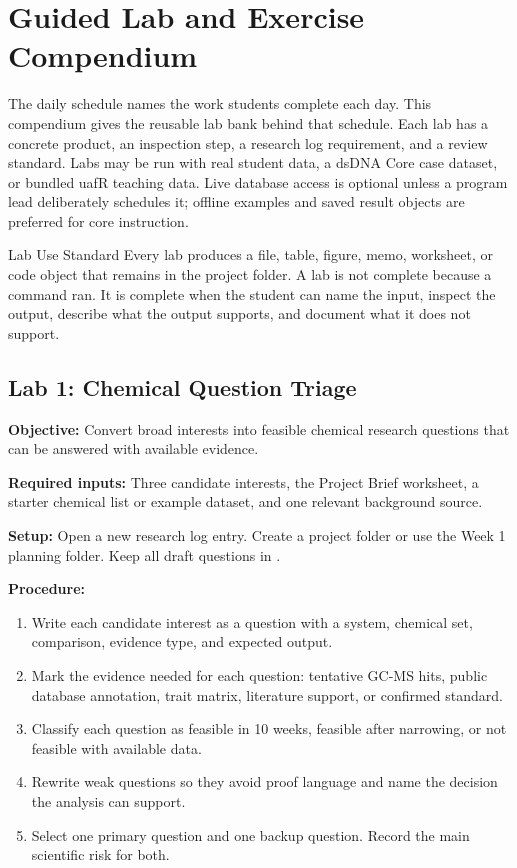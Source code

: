 \chapter{Guided Lab and Exercise Compendium}

The daily schedule names the work students complete each day. This compendium gives the reusable lab bank behind that schedule. Each lab has a concrete product, an inspection step, a research log requirement, and a review standard. Labs may be run with real student data, a dsDNA Core case dataset, or bundled uafR teaching data. Live database access is optional unless a program lead deliberately schedules it; offline examples and saved result objects are preferred for core instruction.

\begin{programbox}{Lab Use Standard}
Every lab produces a file, table, figure, memo, worksheet, or code object that remains in the project folder. A lab is not complete because a command ran. It is complete when the student can name the input, inspect the output, describe what the output supports, and document what it does not support.
\end{programbox}

\section{Lab 1: Chemical Question Triage}
\textbf{Objective:} Convert broad interests into feasible chemical research questions that can be answered with available evidence.

\textbf{Required inputs:} Three candidate interests, the Project Brief worksheet, a starter chemical list or example dataset, and one relevant background source.

\textbf{Setup:} Open a new research log entry. Create a project folder or use the Week 1 planning folder. Keep all draft questions in .

\textbf{Procedure:}
\begin{enumerate}
  \item Write each candidate interest as a question with a system, chemical set, comparison, evidence type, and expected output.
  \item Mark the evidence needed for each question: tentative GC-MS hits, public database annotation, trait matrix, literature support, or confirmed standard.
  \item Classify each question as feasible in 10 weeks, feasible after narrowing, or not feasible with available data.
  \item Rewrite weak questions so they avoid proof language and name the decision the analysis can support.
  \item Select one primary question and one backup question. Record the main scientific risk for both.
\end{enumerate}

